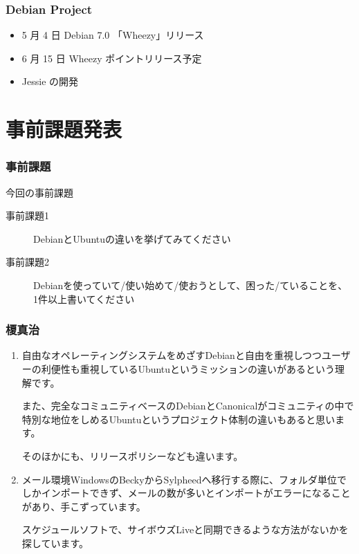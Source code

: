 \documentclass[cjk,dvipdfmx,10pt,compress,%
hyperref={bookmarks=true,bookmarksnumbered=true,bookmarksopen=false,%
colorlinks=false,%
pdftitle={第 72 回 関西 Debian 勉強会},%
pdfauthor={倉敷・のがた・佐々木・かわだ・八津尾},%
pdfsubject={資料},%
}]{beamer}
\begin{document}
\begin{frame}[fragile]
  \frametitle{Debian Project}
  \begin{itemize}
  \item 5 月 4 日 Debian 7.0 「Wheezy」リリース
  \item 6 月 15 日 Wheezy ポイントリリース予定
  \item Jessie の開発
  \end{itemize}
\end{frame}


\section{事前課題発表}


\begin{frame}[fragile]
  \frametitle{事前課題}
  \begin{block}{今回の事前課題}
    \begin{description}
    \item[事前課題1]
      DebianとUbuntuの違いを挙げてみてください
    \item[事前課題2]
      Debianを使っていて/使い始めて/使おうとして、困った/ていることを、
      1件以上書いてください
    \end{description}
  \end{block}
\end{frame}


\begin{frame}
  \frametitle{ 榎真治 }
  \begin{enumerate}
  \item 自由なオペレーティングシステムをめざすDebianと自由を重視しつつユーザーの利便性も重視しているUbuntuというミッションの違いがあるという理解です。

    また、完全なコミュニティベースのDebianとCanonicalがコミュニティの中で特別な地位をしめるUbuntuというプロジェクト体制の違いもあると思います。

    そのほかにも、リリースポリシーなども違います。

  \item メール環境WindowsのBeckyからSylpheedへ移行する際に、フォルダ単位でしかインポートできず、メールの数が多いとインポートがエラーになることがあり、手こずっています。

    スケジュールソフトで、サイボウズLiveと同期できるような方法がないかを探しています。
  \end{enumerate}
\end{frame}
\end{document}
